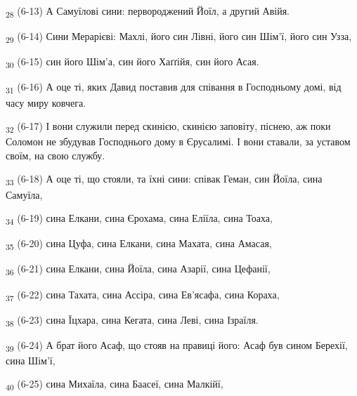 \begin{tcolorbox}
\textsubscript{28} (6-13) А Самуїлові сини: первороджений Йоїл, а другий Авійя.
\end{tcolorbox}
\begin{tcolorbox}
\textsubscript{29} (6-14) Сини Мерарієві: Махлі, його син Лівні, його син Шім'ї, його син Узза,
\end{tcolorbox}
\begin{tcolorbox}
\textsubscript{30} (6-15) син його Шім'а, син його Хаґґійя, син його Асая.
\end{tcolorbox}
\begin{tcolorbox}
\textsubscript{31} (6-16) А оце ті, яких Давид поставив для співання в Господньому домі, від часу миру ковчега.
\end{tcolorbox}
\begin{tcolorbox}
\textsubscript{32} (6-17) І вони служили перед скинією, скинією заповіту, піснею, аж поки Соломон не збудував Господнього дому в Єрусалимі. І вони ставали, за уставом своїм, на свою службу.
\end{tcolorbox}
\begin{tcolorbox}
\textsubscript{33} (6-18) А оце ті, що стояли, та їхні сини: співак Геман, син Йоїла, сина Самуїла,
\end{tcolorbox}
\begin{tcolorbox}
\textsubscript{34} (6-19) сина Елкани, сина Єрохама, сина Еліїла, сина Тоаха,
\end{tcolorbox}
\begin{tcolorbox}
\textsubscript{35} (6-20) сина Цуфа, сина Елкани, сина Махата, сина Амасая,
\end{tcolorbox}
\begin{tcolorbox}
\textsubscript{36} (6-21) сина Елкани, сина Йоїла, сина Азарії, сина Цефанії,
\end{tcolorbox}
\begin{tcolorbox}
\textsubscript{37} (6-22) сина Тахата, сина Ассіра, сина Ев'ясафа, сина Кораха,
\end{tcolorbox}
\begin{tcolorbox}
\textsubscript{38} (6-23) сина Їцхара, сина Кегата, сина Леві, сина Ізраїля.
\end{tcolorbox}
\begin{tcolorbox}
\textsubscript{39} (6-24) А брат його Асаф, що стояв на правиці його: Асаф був сином Берехії, сина Шім'ї,
\end{tcolorbox}
\begin{tcolorbox}
\textsubscript{40} (6-25) сина Михаїла, сина Баасеї, сина Малкійї,
\end{tcolorbox}

